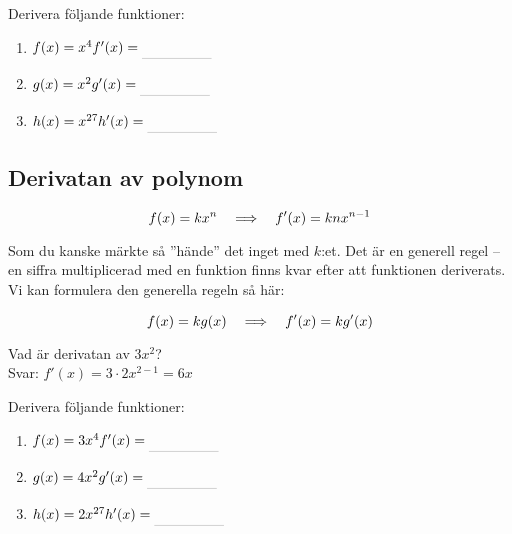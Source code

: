 \documentclass[a4paper, 12pt]{article}
\begin{document}
\begin{uppgifter}
    Derivera följande funktioner:
    \begin{multicols}{3}
        \begin{enumerate}
            \item $f(x) = x^4 \\ f'(x) \ans$
            \item $g(x) = x^2 \\ g'(x) \ans$
            \item $h(x) = x^{27} \\ h'(x) \ans$
        \end{enumerate}
    \end{multicols}
\end{uppgifter}

\subsection{Derivatan av polynom}

\begin{regel}
    \label{reg:kxn}
    \[f(x) = kx^n \hspace{1em} \Longrightarrow \hspace{1em} f'(x) = knx^{n-1}\]
\end{regel}
Som du kanske märkte så ''hände'' det inget med $k$:et. Det är en generell regel -- en siffra multiplicerad med en funktion finns kvar efter att funktionen deriverats. Vi kan formulera den generella regeln så här:

\begin{regel}
    \label{reg:kf(x)}
    \[ f(x) = k g(x) \hspace{1em} \Longrightarrow \hspace{1em} f'(x) = k g'(x) \]
\end{regel}

\begin{exempel}
    Vad är derivatan av $3x^2$? \\ Svar: $f'(x) = 3\cdot 2x^{2-1} = 6x$
\end{exempel}

\begin{uppgifter}
    Derivera följande funktioner:
    \begin{multicols}{3}
        \begin{enumerate}
            \item $f(x) = 3x^4 \\ f'(x) \ans$
            \item $g(x) = 4x^2 \\ g'(x) \ans$
            \item $h(x) = 2x^{27} \\ h'(x) \ans$
        \end{enumerate}
    \end{multicols}
\end{uppgifter}
\end{document}
